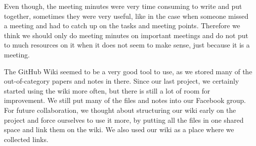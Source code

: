 Even though, the meeting minutes were very time consuming to write and put together, sometimes they were very useful, like in the case when someone missed a meeting and had to catch up on the tasks and meeting points. Therefore we think we should only do meeting minutes on important meetings and do not put to much resources on it when it does not seem to make sense, just because it is a meeting.

The GitHub Wiki seemed to be a very good tool to use, as we stored many of the out-of-category papers and notes in there. Since our last project, we certainly started using the wiki more often, but there is still a lot of room for improvement. We still put many of the files and notes into our Facebook group. For future collaboration, we thought about structuring our wiki early on the project and force ourselves to use it more, by putting all the files in one shared space and link them on the wiki. We also used our wiki as a place where we collected links.
